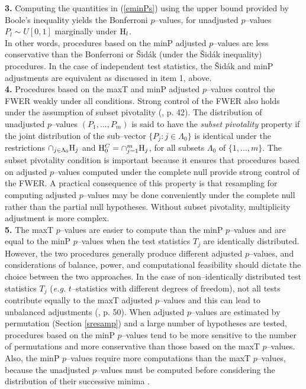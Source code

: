 \documentclass[11pt]{article}
\begin{document}
{\bf 3.} Computing the quantities in (\ref{eminPs}) using the upper
bound provided by Boole's inequality yields the Bonferroni $p$--values,
for unadjusted $p$--values
$P_l \sim U[0,1]$ marginally under ${\rm H}_l$.\\

In other words, procedures based on the minP adjusted $p$--values are less conservative than the Bonferroni or \v{S}id\'{a}k (under the \v{S}id\'{a}k inequality) procedures. In the case of independent test statistics, the \v{S}id\'{a}k and minP adjustments are equivalent as discussed in item 1, above.\\

{\bf 4.} Procedures based on the maxT and minP adjusted $p$--values control the FWER weakly under all conditions. Strong control of the FWER also holds under the assumption of subset pivotality (\cite{Westfall&Young93}, p. 42). The distribution of unadjusted $p$--values $(P_1, \ldots, P_m)$ is said to have the {\it subset pivotality} property if the joint distribution of the sub--vector $\{P_j: j \in \Lambda_0\}$ is identical under the restrictions $\cap_{j \in \Lambda_0} {\rm H}_j$ and ${\rm H}_0^C = \cap_{j=1}^m {\rm H}_j$, for all subsets $\Lambda_0$ of $\{1, \ldots, m\}$. The subset pivotality condition is important because it ensures that procedures based on adjusted $p$--values computed under the complete null provide strong control of the FWER. A practical consequence of this property is that resampling for computing adjusted $p$--values may be done conveniently under the complete null rather than the partial null hypotheses. Without subset pivotality, multiplicity adjustment is more complex.\\

{\bf 5.} The maxT $p$--values are easier to compute than the minP $p$--values and are equal to the minP $p$--values when the test statistics $T_j$ are identically distributed. However, the two procedures generally produce different adjusted $p$--values, and considerations of balance, power, and computational feasibility should dictate the choice between the two approaches. In the case of
  non--identically distributed test statistics $T_j$ ({\it e.g.}
  $t$--statistics with different degrees of freedom), not all tests
  contribute equally to the maxT adjusted $p$--values and this can lead
  to unbalanced adjustments (\cite{Beran88},
  \cite{Westfall&Young93} p. 50). When adjusted $p$--values are estimated by permutation
  (Section \ref{sresamp}) and a large number of hypotheses are tested,
  procedures based on the minP $p$--values tend to be more sensitive to
  the number of permutations and more conservative than those based on
  the maxT $p$--values. Also, the minP $p$--values require more
  computations than the maxT $p$--values, because the unadjusted
  $p$--values must be computed before considering the distribution of
  their successive minima \citep{Ge&Dudoit}. 
\end{document}
